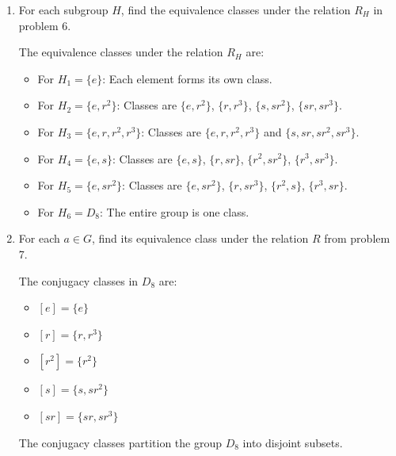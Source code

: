 \begin{enumerate}
\begin{enumerate}
\begin{subanswer}
\begin{itemize}
        \item $C(r) = \{e, r, r^2, r^3\}$
        \item $C(r^2) = D_8$
        \item $C(r^3) = \{e, r, r^2, r^3\}$
        \item $C(s) = \{e, s\}$
        \item $C(sr) = \{e, sr\}$
        \item $C(sr^2) = \{e, sr^2\}$
        \item $C(sr^3) = \{e, sr^3\}$
      \end{itemize}
    \end{subanswer}
    \item For each subgroup $H$, find the equivalence classes under the relation $R_H$ in problem 6.
    \begin{subanswer}
      The equivalence classes under the relation $R_H$ are:
      \begin{itemize}
        \item For $H_1 = \{e\}$: Each element forms its own class.
        \item For $H_2 = \{e, r^2\}$: Classes are $\{e, r^2\}$, $\{r, r^3\}$, $\{s, sr^2\}$, $\{sr, sr^3\}$.
        \item For $H_3 = \{e, r, r^2, r^3\}$: Classes are $\{e, r, r^2, r^3\}$ and $\{s, sr, sr^2, sr^3\}$.
        \item For $H_4 = \{e, s\}$: Classes are $\{e, s\}$, $\{r, sr\}$, $\{r^2, sr^2\}$, $\{r^3, sr^3\}$.
        \item For $H_5 = \{e, sr^2\}$: Classes are $\{e, sr^2\}$, $\{r, sr^3\}$, $\{r^2, s\}$, $\{r^3, sr\}$.
        \item For $H_6 = D_8$: The entire group is one class.
      \end{itemize}
    \end{subanswer}
    \item For each $a \in G$, find its equivalence class under the relation $R$ from problem 7.
    \begin{subanswer}
      The conjugacy classes in $D_8$ are:
      \begin{itemize}
        \item $[e] = \{e\}$
        \item $[r] = \{r, r^3\}$
        \item $[r^2] = \{r^2\}$
        \item $[s] = \{s, sr^2\}$
        \item $[sr] = \{sr, sr^3\}$
      \end{itemize}
      The conjugacy classes partition the group $D_8$ into disjoint subsets.
    \end{subanswer}
  \end{enumerate}


\end{enumerate}
